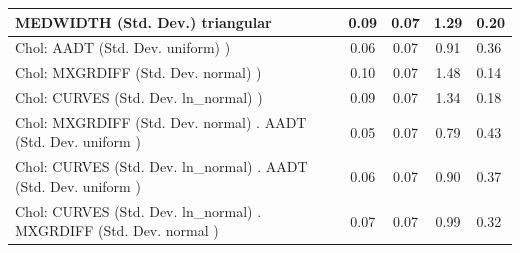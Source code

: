 \begin{table}
\begin{center}
\begin{tabular}{|l|l|c|c|c|l|}
			\hline
			MEDWIDTH (Std. Dev.) triangular &  & 0.09 & 0.07 & 1.29 & 0.20 \\
			\hline
			 Chol: AADT (Std. Dev. uniform) ) &  & 0.06 & 0.07 & 0.91 & 0.36 \\
			\hline
			 Chol: MXGRDIFF (Std. Dev. normal) ) &  & 0.10 & 0.07 & 1.48 & 0.14 \\
			\hline
			 Chol: CURVES (Std. Dev. ln_normal) ) &  & 0.09 & 0.07 & 1.34 & 0.18 \\
			\hline
			 Chol: MXGRDIFF (Std. Dev. normal) . AADT (Std. Dev.   uniform ) &  & 0.05 & 0.07 & 0.79 & 0.43 \\
			\hline
			 Chol: CURVES (Std. Dev. ln_normal) . AADT (Std. Dev.   uniform ) &  & 0.06 & 0.07 & 0.90 & 0.37 \\
			\hline
			 Chol: CURVES (Std. Dev. ln_normal) . MXGRDIFF (Std. Dev.   normal ) &  & 0.07 & 0.07 & 0.99 & 0.32 \\
			\hline
		\end{tabular}
	\end{center}
\end{table}